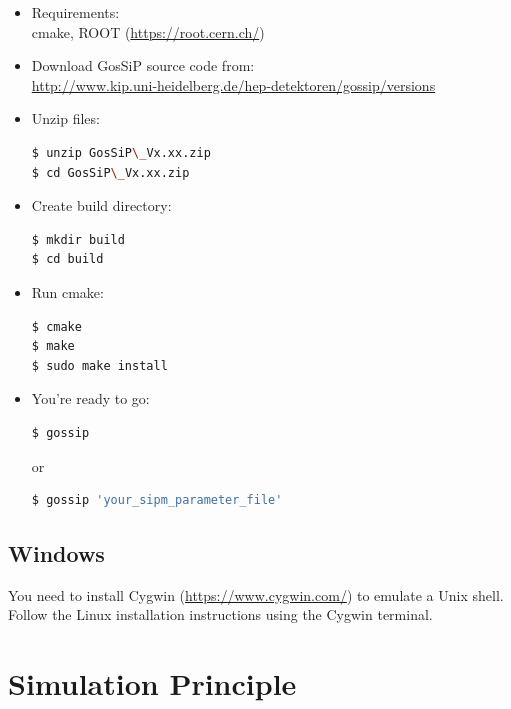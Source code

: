 \begin{itemize}
	\item{Requirements:}\\
		cmake, ROOT (\url{https://root.cern.ch/})
	
	\item{Download GosSiP source code from:}\\
		\url{http://www.kip.uni-heidelberg.de/hep-detektoren/gossip/versions}
		
	\item{Unzip files:}
	\begin{lstlisting}[language=bash]
$ unzip GosSiP\_Vx.xx.zip
$ cd GosSiP\_Vx.xx.zip
	\end{lstlisting}
		
	\item{Create build directory:}
	\begin{lstlisting}[language=bash]
$ mkdir build
$ cd build
	\end{lstlisting}
	
	\item{Run cmake:}
	\begin{lstlisting}[language=bash]
$ cmake
$ make
$ sudo make install
	\end{lstlisting}
		
	\item{You're ready to go:}
	\begin{lstlisting}[language=bash,belowskip=0em]
$ gossip
	\end{lstlisting}
	or
	\begin{lstlisting}[language=bash]
$ gossip 'your_sipm_parameter_file'
	\end{lstlisting}
\end{itemize}

\section{Windows}

You need to install Cygwin (\url{https://www.cygwin.com/}) to emulate a Unix shell.
Follow the Linux installation instructions using the Cygwin terminal.

	

\chapter{Simulation Principle}

